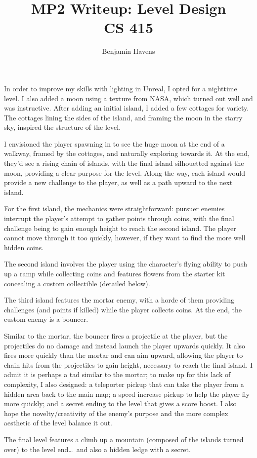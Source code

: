\documentclass{article}
\title{MP2 Writeup: Level Design \\ \large CS 415}
\author{Benjamin Havens}
\begin{document}
\maketitle

In order to improve my skills with lighting in Unreal, I opted for a nighttime level. I also added a moon using a texture from NASA, which turned out well and was instructive. After adding an initial island, I added a few cottages for variety. The cottages lining the sides of the island, and framing the moon in the starry sky, inspired the structure of the level.

I envisioned the player spawning in to see the huge moon at the end of a walkway, framed by the cottages, and naturally exploring towards it. At the end, they'd see a rising chain of islands, with the final island silhouetted against the moon, providing a clear purpose for the level. Along the way, each island would provide a new challenge to the player, as well as a path upward to the next island.

For the first island, the mechanics were straightforward: pursuer enemies interrupt the player's attempt to gather points through coins, with the final challenge being to gain enough height to reach the second island. The player cannot move through it too quickly, however, if they want to find the more well hidden coins.

The second island involves the player using the character's flying ability to push up a ramp while collecting coins and features flowers from the starter kit concealing a custom collectible (detailed below). 

The third island features the mortar enemy, with a horde of them providing challenges (and points if killed) while the player collects coins. At the end, the custom enemy is a bouncer. 

Similar to the mortar, the bouncer fires a projectile at the player, but the projectiles do no damage and instead launch the player upwards quickly. It also fires more quickly than the mortar and can aim upward, allowing the player to chain hits from the projectiles to gain height, necessary to reach the final island. I admit it is perhaps a tad similar to the mortar; to make up for this lack of complexity, I also designed: a teleporter pickup that can take the player from a hidden area back to the main map; a speed increase pickup to help the player fly more quickly; and a secret ending to the level that gives a score boost. I also hope the novelty/creativity of the enemy's purpose and the more complex aesthetic of the level balance it out.

The final level features a climb up a mountain (composed of the islands turned over) to the level end\dots\ and also a hidden ledge with a secret. 


	
\end{document}
